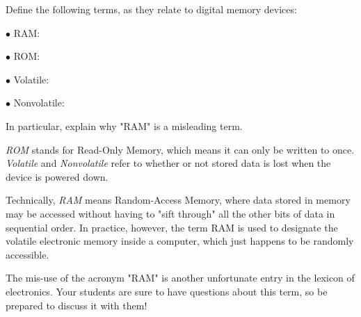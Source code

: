 

Define the following terms, as they relate to digital memory devices:

\medskip
\item{$\bullet$} RAM:
\item{$\bullet$} ROM:
\item{$\bullet$} Volatile:
\item{$\bullet$} Nonvolatile:
\medskip

In particular, explain why "RAM" is a misleading term.







{\it ROM} stands for Read-Only Memory, which means it can only be written to once.  {\it Volatile} and {\it Nonvolatile} refer to whether or not stored data is lost when the device is powered down.

Technically, {\it RAM} means Random-Access Memory, where data stored in memory may be accessed without having to "sift through" all the other bits of data in sequential order.  In practice, however, the term RAM is used to designate the volatile electronic memory inside a computer, which just happens to be randomly accessible.







The mis-use of the acronym "RAM" is another unfortunate entry in the lexicon of electronics.  Your students are sure to have questions about this term, so be prepared to discuss it with them!





